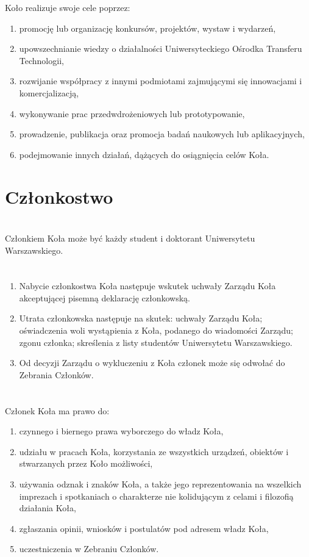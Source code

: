 \documentclass[a4paper]{article}
\begin{document}
Koło realizuje swoje cele poprzez:
\begin{enumerate}[label=\alph*)]
\item promocję lub organizację konkursów, projektów, wystaw i wydarzeń,
\item upowszechnianie wiedzy o działalności Uniwersyteckiego Ośrodka Transferu Technologii,
\item rozwijanie współpracy z innymi podmiotami zajmującymi się innowacjami i komercjalizacją,
\item wykonywanie prac przedwdrożeniowych lub prototypowanie,
\item prowadzenie, publikacja oraz promocja badań naukowych lub aplikacyjnych,
\item podejmowanie innych działań, dążących do osiągnięcia celów Koła.
\end{enumerate}


\section*{Członkostwo~~~}
\section{}
Członkiem Koła może być każdy student i doktorant Uniwersytetu Warszawskiego.

\section{}
\begin{enumerate}
\item Nabycie członkostwa Koła następuje wskutek uchwały Zarządu Koła akceptującej pisemną deklarację członkowską.
\item Utrata członkowska następuje na skutek: uchwały Zarządu Koła; oświadczenia woli wystąpienia z Koła, podanego do wiadomości Zarządu; zgonu członka; skreślenia z listy studentów Uniwersytetu Warszawskiego.
\item Od decyzji Zarządu o wykluczeniu z Koła członek może się odwołać do Zebrania Członków.
\end{enumerate}

\section{}
Członek Koła ma prawo do:
\begin{enumerate}[label=\alph*)]
\item czynnego i biernego prawa wyborczego do władz Koła,
\item udziału w pracach Koła, korzystania ze wszystkich urządzeń, obiektów i stwarzanych przez Koło możliwości,
\item używania odznak i znaków Koła, a także jego reprezentowania na wszelkich imprezach i spotkaniach o charakterze nie kolidującym z celami i filozofią działania Koła,
\item zgłaszania opinii, wniosków i postulatów pod adresem władz Koła,
\item uczestniczenia w Zebraniu Członków.
\end{enumerate}
\end{document}
